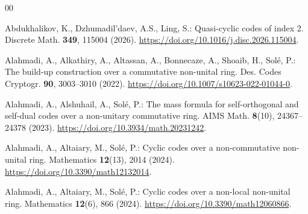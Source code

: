 \documentclass[12pt]{article}
\theoremstyle{definition}
\theoremstyle{plain}
\begin{document}
\begin{thebibliography}{00}




Abdukhalikov, K., Dzhumadil'daev, A.S., Ling, S.: Quasi-cyclic codes of index 2. Discrete Math. \textbf{349}, 115004 (2026). \href{https://doi.org/10.1016/j.disc.2026.115004}{https://doi.org/10.1016/j.disc.2026.115004}.



 Alahmadi, A., Alkathiry, A., Altassan, A., Bonnecaze, A., Shoaib, H., Sol\'{e}, P.: The build-up construction over a commutative non-unital ring. Des. Codes Cryptogr. \textbf{90}, 3003–3010 (2022). \href{https://doi.org/10.1007/s10623-022-01044-0}{https://doi.org/10.1007/s10623-022-01044-0}.



 Alahmadi, A., Alshuhail, A., Solé, P.: The mass formula for self-orthogonal and self-dual codes over a non-unitary commutative ring. AIMS Math. \textbf{8}(10), 24367–24378 (2023). \href{https://doi.org/10.3934/math.20231242}{https://doi.org/10.3934/math.20231242}.



 Alahmadi, A., Altaiary, M., Sol\'{e}, P.: Cyclic codes over a non-commutative non-unital ring. Mathematics \textbf{12}(13), 2014 (2024). \href{https://doi.org/10.3390/math12132014}{https://doi.org/10.3390/math12132014}.



 Alahmadi, A., Altaiary, M., Sol\'{e}, P.: Cyclic codes over a non-local non-unital ring. Mathematics \textbf{12}(6), 866 (2024). \href{https://doi.org/10.3390/math12060866}{https://doi.org/10.3390/math12060866}.



\end{thebibliography}
\end{document}

